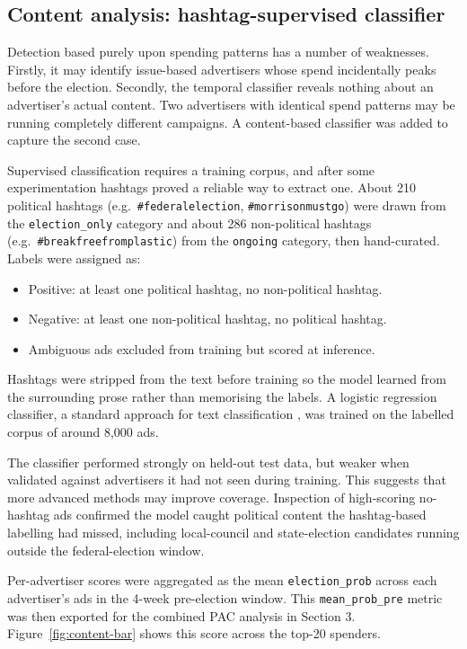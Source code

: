 \documentclass[11pt,a4paper]{article}
\begin{document}
\subsection{Content analysis: hashtag-supervised classifier}

Detection based purely upon spending patterns has a number of weaknesses. Firstly, it may identify issue-based advertisers whose spend incidentally peaks before the election. Secondly, the temporal classifier reveals nothing about an advertiser's actual content. Two advertisers with identical spend patterns may be running completely different campaigns. A content-based classifier was added to capture the second case.

Supervised classification requires a training corpus, and after some experimentation hashtags proved a reliable way to extract one. About 210 political hashtags (e.g.\ \texttt{\#federalelection}, \texttt{\#morrisonmustgo}) were drawn from the \texttt{election\_only} category and about 286 non-political hashtags (e.g.\ \texttt{\#breakfreefromplastic}) from the \texttt{ongoing} category, then hand-curated. Labels were assigned as:

\begin{itemize}
  \item Positive: at least one political hashtag, no non-political hashtag.
  \item Negative: at least one non-political hashtag, no political hashtag.
  \item Ambiguous ads excluded from training but scored at inference.
\end{itemize}

Hashtags were stripped from the text before training so the model learned from the surrounding prose rather than memorising the labels. A logistic regression classifier, a standard approach for text classification \citep{manning2008iir}, was trained on the labelled corpus of around 8{,}000 ads.

The classifier performed strongly on held-out test data, but weaker when validated against advertisers it had not seen during training. This suggests that more advanced methods may improve coverage. Inspection of high-scoring no-hashtag ads confirmed the model caught political content the hashtag-based labelling had missed, including local-council and state-election candidates running outside the federal-election window.

Per-advertiser scores were aggregated as the mean \texttt{election\_prob} across each advertiser's ads in the 4-week pre-election window. This \texttt{mean\_prob\_pre} metric was then exported for the combined PAC analysis in Section 3. Figure~\ref{fig:content-bar} shows this score across the top-20 spenders.
\end{document}
